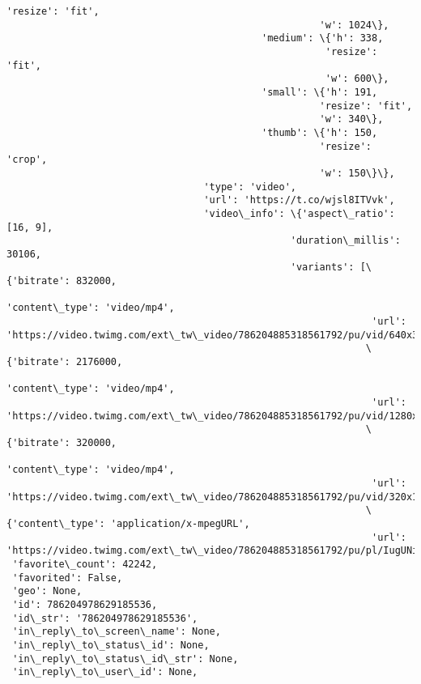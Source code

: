 \documentclass[11pt]{article}
\begin{document}
\begin{Verbatim}[commandchars=\\\{\}]
                                                      'resize': 'fit',
                                                      'w': 1024\},
                                            'medium': \{'h': 338,
                                                       'resize': 'fit',
                                                       'w': 600\},
                                            'small': \{'h': 191,
                                                      'resize': 'fit',
                                                      'w': 340\},
                                            'thumb': \{'h': 150,
                                                      'resize': 'crop',
                                                      'w': 150\}\},
                                  'type': 'video',
                                  'url': 'https://t.co/wjsl8ITVvk',
                                  'video\_info': \{'aspect\_ratio': [16, 9],
                                                 'duration\_millis': 30106,
                                                 'variants': [\{'bitrate': 832000,
                                                               'content\_type': 'video/mp4',
                                                               'url': 'https://video.twimg.com/ext\_tw\_video/786204885318561792/pu/vid/640x360/6vt24D3ZQSvYuDqe.mp4'\},
                                                              \{'bitrate': 2176000,
                                                               'content\_type': 'video/mp4',
                                                               'url': 'https://video.twimg.com/ext\_tw\_video/786204885318561792/pu/vid/1280x720/rSbgQdvR9TPIlRWr.mp4'\},
                                                              \{'bitrate': 320000,
                                                               'content\_type': 'video/mp4',
                                                               'url': 'https://video.twimg.com/ext\_tw\_video/786204885318561792/pu/vid/320x180/JuNJDqr1KHqoP83N.mp4'\},
                                                              \{'content\_type': 'application/x-mpegURL',
                                                               'url': 'https://video.twimg.com/ext\_tw\_video/786204885318561792/pu/pl/IugUNii3a7lmjApS.m3u8'\}]\}\}]\},
 'favorite\_count': 42242,
 'favorited': False,
 'geo': None,
 'id': 786204978629185536,
 'id\_str': '786204978629185536',
 'in\_reply\_to\_screen\_name': None,
 'in\_reply\_to\_status\_id': None,
 'in\_reply\_to\_status\_id\_str': None,
 'in\_reply\_to\_user\_id': None,

\end{Verbatim}
\end{document}
